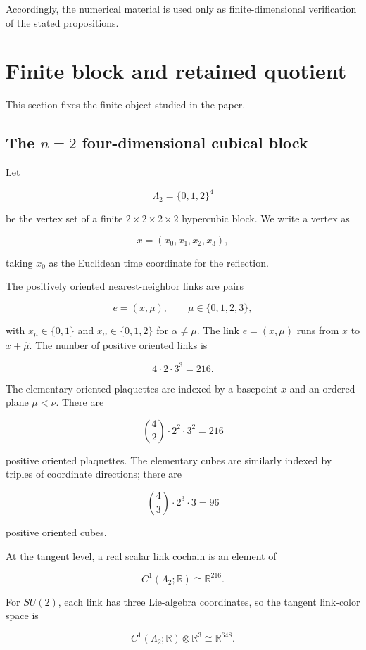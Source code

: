 \documentclass[10pt]{article}
\begin{document}
Accordingly, the numerical material is used only as finite-dimensional verification of the stated propositions.

\section{Finite block and retained quotient}

This section fixes the finite object studied in the paper.

\subsection{The \(n=2\) four-dimensional cubical block}

Let

\[
\Lambda_2=\{0,1,2\}^4
\]

be the vertex set of a finite \(2\times2\times2\times2\) hypercubic block.  We write a vertex as

\[
x=(x_0,x_1,x_2,x_3),
\]

taking \(x_0\) as the Euclidean time coordinate for the reflection.

The positively oriented nearest-neighbor links are pairs

\[
e=(x,\mu),\qquad \mu\in\{0,1,2,3\},
\]

with \(x_\mu\in\{0,1\}\) and \(x_\alpha\in\{0,1,2\}\) for \(\alpha\ne\mu\).  The link \(e=(x,\mu)\) runs from \(x\) to \(x+\hat\mu\).  The number of positive oriented links is

\[
4\cdot 2\cdot 3^3=216.
\]

The elementary oriented plaquettes are indexed by a basepoint \(x\) and an ordered plane \(\mu<\nu\).  There are

\[
\binom42\cdot 2^2\cdot 3^2=216
\]

positive oriented plaquettes.  The elementary cubes are similarly indexed by triples of coordinate directions; there are

\[
\binom43\cdot 2^3\cdot 3=96
\]

positive oriented cubes.

At the tangent level, a real scalar link cochain is an element of

\[
C^1(\Lambda_2;\mathbb R)\cong\mathbb R^{216}.
\]

For \(SU(2)\), each link has three Lie-algebra coordinates, so the tangent link-color space is

\[
C^1(\Lambda_2;\mathbb R)\otimes\mathbb R^3
\cong
\mathbb R^{648}.
\]
\end{document}
